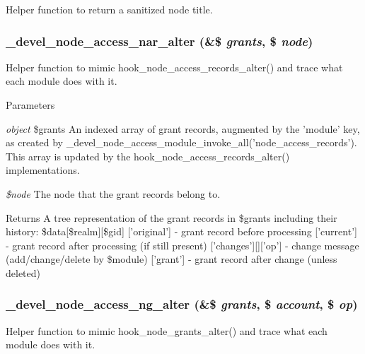 \label{devel__node__access_8module_aae8673d182a87acb3b8039decbe5fb4f}
Helper function to return a sanitized node title. \hypertarget{devel__node__access_8module_a4e53f1761aae77265e0b5fecfef17875}{
\subsubsection[{\_\-devel\_\-node\_\-access\_\-nar\_\-alter}]{\setlength{\rightskip}{0pt plus 5cm}\_\-devel\_\-node\_\-access\_\-nar\_\-alter (\&\$ {\em grants}, \/  \$ {\em node})}}
\label{devel__node__access_8module_a4e53f1761aae77265e0b5fecfef17875}
Helper function to mimic hook\_\-node\_\-access\_\-records\_\-alter() and trace what each module does with it.


\begin{DoxyParams}{Parameters}
\item[{\em object}]\$grants An indexed array of grant records, augmented by the 'module' key, as created by \_\-devel\_\-node\_\-access\_\-module\_\-invoke\_\-all('node\_\-access\_\-records'). This array is updated by the hook\_\-node\_\-access\_\-records\_\-alter() implementations.\item[{\em \$node}]The node that the grant records belong to.\end{DoxyParams}
\begin{DoxyReturn}{Returns}
A tree representation of the grant records in \$grants including their history: \$data\mbox{[}\$realm\mbox{]}\mbox{[}\$gid\mbox{]} \mbox{[}'original'\mbox{]} -\/ grant record before processing \mbox{[}'current'\mbox{]} -\/ grant record after processing (if still present) \mbox{[}'changes'\mbox{]}\mbox{[}\mbox{]}\mbox{[}'op'\mbox{]} -\/ change message (add/change/delete by \$module) \mbox{[}'grant'\mbox{]} -\/ grant record after change (unless deleted) 
\end{DoxyReturn}
\hypertarget{devel__node__access_8module_a00d150a03a2dfbbe199be12f0c49f738}{
\subsubsection[{\_\-devel\_\-node\_\-access\_\-ng\_\-alter}]{\setlength{\rightskip}{0pt plus 5cm}\_\-devel\_\-node\_\-access\_\-ng\_\-alter (\&\$ {\em grants}, \/  \$ {\em account}, \/  \$ {\em op})}}
\label{devel__node__access_8module_a00d150a03a2dfbbe199be12f0c49f738}
Helper function to mimic hook\_\-node\_\-grants\_\-alter() and trace what each module does with it.


